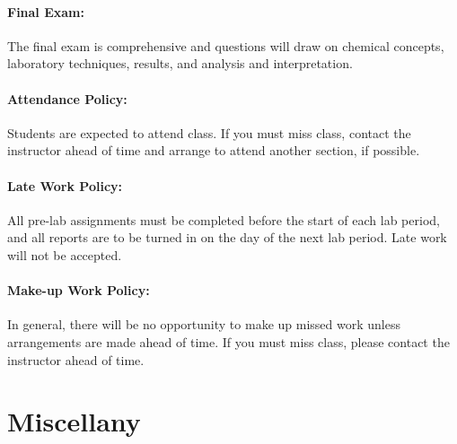 \documentclass[12pt, letterpaper]{article}
\begin{document}
\paragraph{Final Exam:}
The final exam is comprehensive and questions will draw on chemical concepts, laboratory techniques, results, and analysis and interpretation. 

\paragraph{Attendance Policy:}
Students are expected to attend class. If you must miss class, contact the instructor ahead of time and arrange to attend another section, if possible.

\paragraph{Late Work Policy:}
All pre-lab assignments must be completed before the start of each lab period, and all reports are to be turned in on the day of the next lab period. Late work will not be accepted.

\paragraph{Make-up Work Policy:}
In general, there will be no opportunity to make up missed work unless arrangements are made ahead of time. If you must miss class, please contact the instructor ahead of time. 

\section*{Miscellany}
\end{document}
